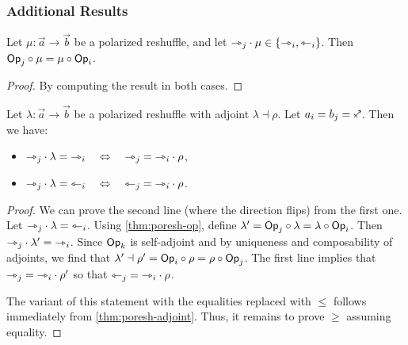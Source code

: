 \documentclass[a4paper]{memoir}
\begin{document}
\subsubsection{Additional Results}
\begin{proposition} \label{thm:poresh-op}
	Let $\mu : \vec a \to \vec b$ be a polarized reshuffle, and let ${\rightarrowtriangle}_j \cdot \mu \in \mathopen{}\left\{ {\rightarrowtriangle}_i, {\leftarrowtriangle}_i \right\}\mathclose{}$.
	Then ${\mathsf{Op}}_j \circ \mu = \mu \circ {\mathsf{Op}}_i$.
\end{proposition}
\begin{proof}
	By computing the result in both cases.
\end{proof}
\begin{proposition} \label{thm:poresh-adjoint-directed}
	Let $\lambda : \vec a \to \vec b$ be a polarized reshuffle with adjoint $\lambda \dashv \rho$. Let $a_i = b_j = \ypolar$. Then we have:
	\begin{itemize}
		\item ${\rightarrowtriangle}_j \cdot \lambda = {\rightarrowtriangle}_i \quad\Leftrightarrow\quad {\rightarrowtriangle}_j = {\rightarrowtriangle}_i \cdot \rho$,
		\item ${\rightarrowtriangle}_j \cdot \lambda = {\leftarrowtriangle}_i \quad\Leftrightarrow\quad {\leftarrowtriangle}_j = {\rightarrowtriangle}_i \cdot \rho$.
	\end{itemize}
\end{proposition}
\begin{proof}
	We can prove the second line (where the direction flips) from the first one.
	Let ${\rightarrowtriangle}_j \cdot \lambda = {\leftarrowtriangle}_i$.
	Using \cref{thm:poresh-op}, define $\lambda' = {\mathsf{Op}}_j \circ \lambda = \lambda \circ {\mathsf{Op}}_i$.
	Then ${\rightarrowtriangle}_j \cdot \lambda' = {\rightarrowtriangle}_i$.
	Since ${\mathsf{Op}}_k$ is self-adjoint and by uniqueness and composability of adjoints, we find that $\lambda' \dashv \rho' = {\mathsf{Op}}_i \circ \rho = \rho \circ {\mathsf{Op}}_j$.
	The first line implies that ${\rightarrowtriangle}_j = {\rightarrowtriangle}_i \cdot \rho'$ so that ${\leftarrowtriangle}_j = {\rightarrowtriangle}_i \cdot \rho$.

	The variant of this statement with the equalities replaced with $\leq$ follows immediately from \cref{thm:poresh-adjoint}.
	Thus, it remains to prove $\geq$ assuming equality.
\end{proof}
\end{document}
